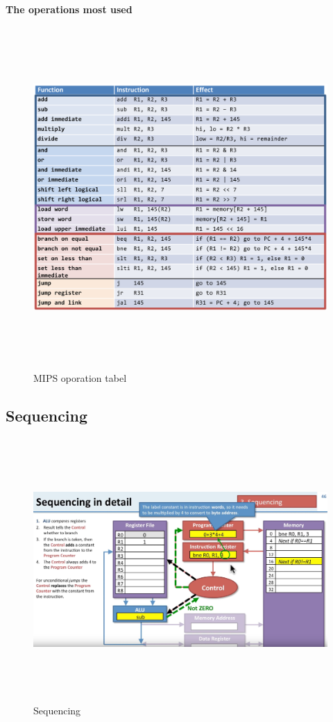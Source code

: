 \noindent\textbf{The operations most used} \newline
\begin{figure}[h]
    \vspace{10mm}
    \centering
    \includegraphics[width=16cm, height=13cm]{image/mips-tabel.png} 
    \caption{MIPS oporation tabel}
\end{figure}

\newpage

\subsection{Sequencing}
\begin{figure}[h]
    \vspace{10mm}
    \centering
    \includegraphics[width=16cm, height=10cm]{image/sequencing.png} 
    \caption{Sequencing}
\end{figure}
\newpage

